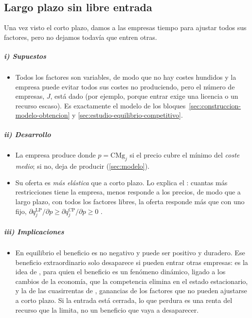 \documentclass[11pt]{article}
\begin{document}
\subsection{Largo plazo sin libre entrada}\label{sec:largo-plazo-libre}

Una vez visto el corto plazo, damos a las empresas tiempo para ajustar todos sus factores, pero no dejamos todavía que entren otras.

\subparagraph{i) Supuestos}

\begin{itemize}
\item Todos los factores son variables, de modo que no hay costes hundidos y la empresa puede evitar todos sus costes no produciendo, pero el número de empresas, $J$, está dado (por ejemplo, porque entrar exige una licencia o un recurso escaso). Es exactamente el modelo de los bloques~\ref{sec:construccion-modelo-obtencion} y \ref{sec:estudio-equilibrio-competitivo}.
\end{itemize}

\subparagraph{ii) Desarrollo}

\begin{itemize}
\item La empresa produce donde $p=\mathrm{CMg}_j$ si el precio cubre el mínimo del \emph{coste medio}; si no, deja de producir (\ref{sec:modelo}).
\item Su oferta es \emph{más elástica} que a corto plazo. Lo explica el : cuantas más restricciones tiene la empresa, menos responde a los precios, de modo que a largo plazo, con todos los factores libres, la oferta responde más que con uno fijo, $\partial q^{\mathrm{LP}}_j/\partial p\geq\partial q^{\mathrm{CP}}_j/\partial p\geq 0$\nocite{Samuelson1947Foundations,LeChatelier1884Enonce} .
\end{itemize}

\subparagraph{iii) Implicaciones}

\begin{itemize}
\item En equilibrio el beneficio es no negativo y puede ser positivo y duradero. Ese beneficio extraordinario solo desaparece si pueden entrar otras empresas: es la idea de \textcite{Clark1899Distribution}, para quien el beneficio es un fenómeno dinámico, ligado a los cambios de la economía, que la competencia elimina en el estado estacionario, y la de las cuasirrentas de \textcite[libro~V, caps.~VIII y IX]{Marshall1890Principles}, ganancias de los factores que no pueden ajustarse a corto plazo. Si la entrada está cerrada, lo que perdura es una renta del recurso que la limita, no un beneficio que vaya a desaparecer.
\end{itemize}
\end{document}
